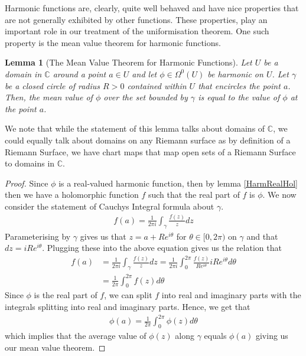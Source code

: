 \documentclass[11pt]{report}
\newtheorem{lemma}[thm]{Lemma}
\theoremstyle{definition}
\begin{document}
Harmonic functions are, clearly, quite well behaved and have nice properties that are not generally exhibited by other functions. These properties, play an important role in our treatment of the uniformisation theorem. One such property is the mean value theorem for harmonic functions.

\begin{lemma}[The Mean Value Theorem for Harmonic Functions]\label{MVT}
  Let $U$ be a domain in $\mathbb{C}$ around a point $a \in U$ and let $\phi \in \Omega^0(U)$ be harmonic on $U$. Let $\gamma$ be a closed circle of radius $R > 0$ contained within $U$ that encircles the point $a$. Then, the mean value of $\phi$ over the set bounded by $\gamma$ is equal to the value of $\phi$ at the point $a$. 
\end{lemma}
We note that while the statement of this lemma talks about domains of $\mathbb{C}$, we could equally talk about domains on any Riemann surface as by definition of a Riemann Surface, we have chart maps that map open sets of a Riemann Surface to domains in $\mathbb{C}$. 
\begin{proof}
  Since $\phi$ is a real-valued harmonic function, then by lemma \ref{HarmRealHol} then we have a holomorphic function $f$ such that the real part of $f$ is $\phi$. We now consider the statement of Cauchys Integral formula about $\gamma$.
  \begin{align*}
    f(a) = \frac{1}{2\pi i}\int_{\gamma}\frac{f(z)}{z}dz
  \end{align*}
  Parameterising by $\gamma$ gives us that $z= a + Re^{i\theta}$ for $\theta \in [0, 2\pi)$ on $\gamma$ and that $dz = iRe^{i\theta}$. Plugging these into the above equation gives us the relation that
  \begin{align*}
    f(a) &= \frac{1}{2\pi i}\int_{\gamma}\frac{f(z)}{z}dz = \frac{1}{2\pi i}\int_0^{2\pi}\frac{f(z)}{Re^{i\theta}}iRe^{i\theta}d\theta \\
    &= \frac{1}{2\pi}\int_0^{2\pi}f(z)d\theta
  \end{align*}
  Since $\phi$ is the real part of $f$, we can split $f$ into real and imaginary parts with the integrals splitting into real and imaginary parts. Hence, we get that 
  \begin{align*}
    \phi(a)=\frac{1}{2\pi}\int_0^{2\pi}\phi(z)d\theta
  \end{align*}
    which implies that the average value of $\phi(z)$ along $\gamma$ equals $\phi(a)$ giving us our mean value theorem.
\end{proof}
\end{document}
